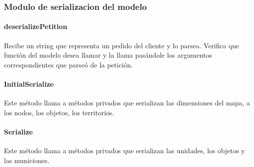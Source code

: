     \subsubsection{Modulo de serializacion del modelo}
        \paragraph{deserializePetition}
            Recibe un string que representa un pedido del cliente y lo parsea.
            Verifica que función del modelo desea llamar y la llama pasándole los
            argumentos correspondientes que parseó de la petición.
        \paragraph{InitialSerialize}
            Este método llama a métodos privados que serializan las dimensiones
            del mapa, a los nodos, los objetos, los territorios.
        \paragraph{Serialize}
            Este método llama a métodos privados que serializan las unidades, los
            objetos y las municiones.